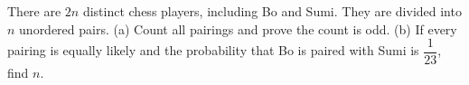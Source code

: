 There are $2n$ distinct chess players, including Bo and Sumi. They are divided into $n$ unordered pairs. (a) Count all pairings and prove the count is odd. (b) If every pairing is equally likely and the probability that Bo is paired with Sumi is $\dfrac{1}{23}$, find $n$.
